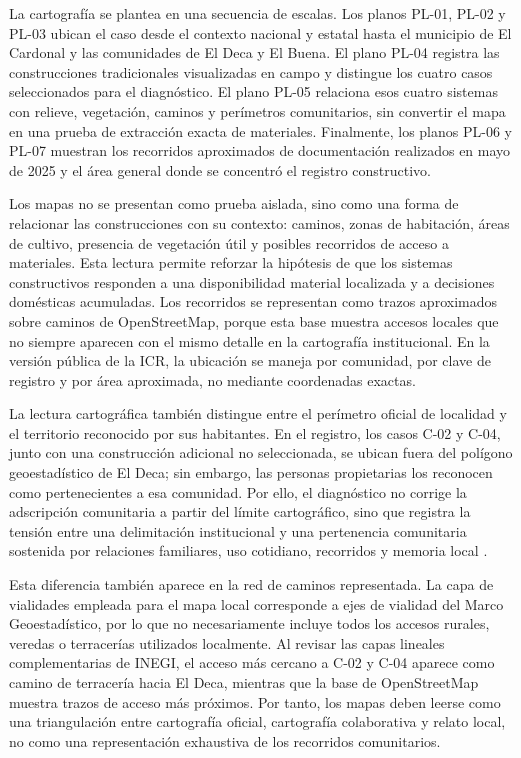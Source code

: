 La cartografía se plantea en una secuencia de escalas. Los planos PL-01, PL-02 y PL-03 ubican el caso desde el contexto nacional y estatal hasta el municipio de El Cardonal y las comunidades de El Deca y El Buena. El plano PL-04 registra las construcciones tradicionales visualizadas en campo y distingue los cuatro casos seleccionados para el diagnóstico. El plano PL-05 relaciona esos cuatro sistemas con relieve, vegetación, caminos y perímetros comunitarios, sin convertir el mapa en una prueba de extracción exacta de materiales. Finalmente, los planos PL-06 y PL-07 muestran los recorridos aproximados de documentación realizados en mayo de 2025 y el área general donde se concentró el registro constructivo.

Los mapas no se presentan como prueba aislada, sino como una forma de relacionar las construcciones con su contexto: caminos, zonas de habitación, áreas de cultivo, presencia de vegetación útil y posibles recorridos de acceso a materiales. Esta lectura permite reforzar la hipótesis de que los sistemas constructivos responden a una disponibilidad material localizada y a decisiones domésticas acumuladas. Los recorridos se representan como trazos aproximados sobre caminos de OpenStreetMap, porque esta base muestra accesos locales que no siempre aparecen con el mismo detalle en la cartografía institucional. En la versión pública de la ICR, la ubicación se maneja por comunidad, por clave de registro y por área aproximada, no mediante coordenadas exactas.

La lectura cartográfica también distingue entre el perímetro oficial de localidad y el territorio reconocido por sus habitantes. En el registro, los casos C-02 y C-04, junto con una construcción adicional no seleccionada, se ubican fuera del polígono geoestadístico de El Deca; sin embargo, las personas propietarias los reconocen como pertenecientes a esa comunidad. Por ello, el diagnóstico no corrige la adscripción comunitaria a partir del límite cartográfico, sino que registra la tensión entre una delimitación institucional y una pertenencia comunitaria sostenida por relaciones familiares, uso cotidiano, recorridos y memoria local \citep{ziccardi2015habitabilidad, cortes2014juventud}.

Esta diferencia también aparece en la red de caminos representada. La capa de vialidades empleada para el mapa local corresponde a ejes de vialidad del Marco Geoestadístico, por lo que no necesariamente incluye todos los accesos rurales, veredas o terracerías utilizados localmente. Al revisar las capas lineales complementarias de INEGI, el acceso más cercano a C-02 y C-04 aparece como camino de terracería hacia El Deca, mientras que la base de OpenStreetMap muestra trazos de acceso más próximos. Por tanto, los mapas deben leerse como una triangulación entre cartografía oficial, cartografía colaborativa y relato local, no como una representación exhaustiva de los recorridos comunitarios.

